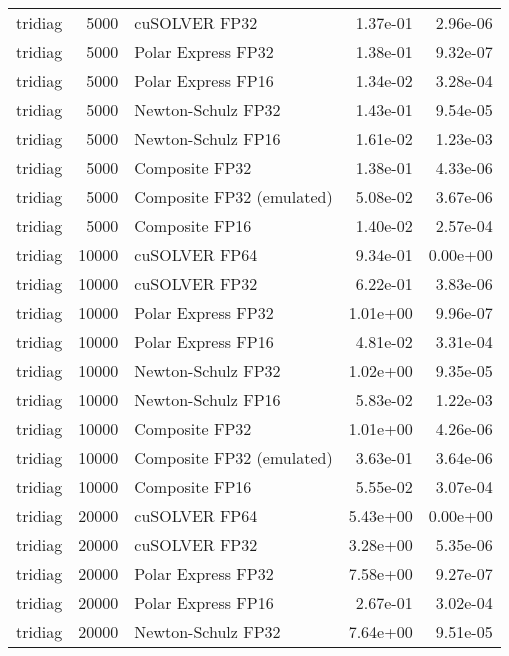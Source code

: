 \begin{table}
\begin{tabular}{lrlrr}
  tridiag &  5000 &             cuSOLVER FP32 &  1.37e-01 &        2.96e-06 \\
  tridiag &  5000 &        Polar Express FP32 &  1.38e-01 &        9.32e-07 \\
  tridiag &  5000 &        Polar Express FP16 &  1.34e-02 &        3.28e-04 \\
  tridiag &  5000 &        Newton-Schulz FP32 &  1.43e-01 &        9.54e-05 \\
  tridiag &  5000 &        Newton-Schulz FP16 &  1.61e-02 &        1.23e-03 \\
  tridiag &  5000 &            Composite FP32 &  1.38e-01 &        4.33e-06 \\
  tridiag &  5000 & Composite FP32 (emulated) &  5.08e-02 &        3.67e-06 \\
  tridiag &  5000 &            Composite FP16 &  1.40e-02 &        2.57e-04 \\
  tridiag & 10000 &             cuSOLVER FP64 &  9.34e-01 &        0.00e+00 \\
  tridiag & 10000 &             cuSOLVER FP32 &  6.22e-01 &        3.83e-06 \\
  tridiag & 10000 &        Polar Express FP32 &  1.01e+00 &        9.96e-07 \\
  tridiag & 10000 &        Polar Express FP16 &  4.81e-02 &        3.31e-04 \\
  tridiag & 10000 &        Newton-Schulz FP32 &  1.02e+00 &        9.35e-05 \\
  tridiag & 10000 &        Newton-Schulz FP16 &  5.83e-02 &        1.22e-03 \\
  tridiag & 10000 &            Composite FP32 &  1.01e+00 &        4.26e-06 \\
  tridiag & 10000 & Composite FP32 (emulated) &  3.63e-01 &        3.64e-06 \\
  tridiag & 10000 &            Composite FP16 &  5.55e-02 &        3.07e-04 \\
  tridiag & 20000 &             cuSOLVER FP64 &  5.43e+00 &        0.00e+00 \\
  tridiag & 20000 &             cuSOLVER FP32 &  3.28e+00 &        5.35e-06 \\
  tridiag & 20000 &        Polar Express FP32 &  7.58e+00 &        9.27e-07 \\
  tridiag & 20000 &        Polar Express FP16 &  2.67e-01 &        3.02e-04 \\
  tridiag & 20000 &        Newton-Schulz FP32 &  7.64e+00 &        9.51e-05 \\

\end{tabular}
\end{table}

